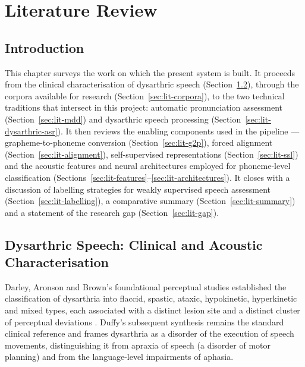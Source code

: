 \chapter{Literature Review}
\label{ch:literature}

\section{Introduction}

This chapter surveys the work on which the present system is built. It proceeds
from the clinical characterisation of dysarthric speech
(Section~\ref{sec:lit-dysarthria}), through the corpora available for research
(Section~\ref{sec:lit-corpora}), to the two technical traditions that intersect
in this project: automatic pronunciation assessment
(Section~\ref{sec:lit-mdd}) and dysarthric speech processing
(Section~\ref{sec:lit-dysarthric-asr}). It then reviews the enabling
components used in the pipeline --- grapheme-to-phoneme conversion
(Section~\ref{sec:lit-g2p}), forced alignment
(Section~\ref{sec:lit-alignment}), self-supervised representations
(Section~\ref{sec:lit-ssl}) and the acoustic features and neural architectures
employed for phoneme-level classification
(Sections~\ref{sec:lit-features}--\ref{sec:lit-architectures}). It closes with
a discussion of labelling strategies for weakly supervised speech assessment
(Section~\ref{sec:lit-labelling}), a comparative summary
(Section~\ref{sec:lit-summary}) and a statement of the research gap
(Section~\ref{sec:lit-gap}).

\section{Dysarthric Speech: Clinical and Acoustic Characterisation}
\label{sec:lit-dysarthria}

Darley, Aronson and Brown's foundational perceptual studies established the
classification of dysarthria into flaccid, spastic, ataxic, hypokinetic,
hyperkinetic and mixed types, each associated with a distinct lesion site and
a distinct cluster of perceptual deviations \cite{darley1969differential}.
Duffy's subsequent synthesis \cite{duffy2019motor} remains the standard
clinical reference and frames dysarthria as a disorder of the execution of
speech movements, distinguishing it from apraxia of speech (a disorder of motor
planning) and from the language-level impairments of aphasia.

